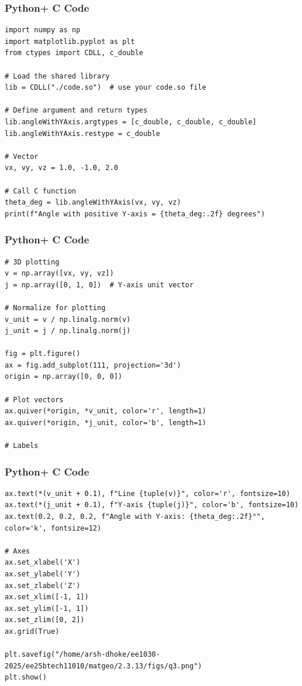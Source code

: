 \documentclass{beamer}
\begin{document}
\begin{frame}[fragile]
    \frametitle{Python+ C Code}
\begin{lstlisting}
import numpy as np
import matplotlib.pyplot as plt
from ctypes import CDLL, c_double

# Load the shared library
lib = CDLL("./code.so")  # use your code.so file

# Define argument and return types
lib.angleWithYAxis.argtypes = [c_double, c_double, c_double]
lib.angleWithYAxis.restype = c_double

# Vector
vx, vy, vz = 1.0, -1.0, 2.0

# Call C function
theta_deg = lib.angleWithYAxis(vx, vy, vz)
print(f"Angle with positive Y-axis = {theta_deg:.2f} degrees")

\end{lstlisting}
\end{frame}

\begin{frame}[fragile]
    \frametitle{Python+ C Code}
\begin{lstlisting}
# 3D plotting
v = np.array([vx, vy, vz])
j = np.array([0, 1, 0])  # Y-axis unit vector

# Normalize for plotting
v_unit = v / np.linalg.norm(v)
j_unit = j / np.linalg.norm(j)

fig = plt.figure()
ax = fig.add_subplot(111, projection='3d')
origin = np.array([0, 0, 0])

# Plot vectors
ax.quiver(*origin, *v_unit, color='r', length=1)
ax.quiver(*origin, *j_unit, color='b', length=1)

# Labels
\end{lstlisting}
\end{frame}

\begin{frame}[fragile]
    \frametitle{Python+ C Code}
\begin{lstlisting}
ax.text(*(v_unit + 0.1), f"Line {tuple(v)}", color='r', fontsize=10)
ax.text(*(j_unit + 0.1), f"Y-axis {tuple(j)}", color='b', fontsize=10)
ax.text(0.2, 0.2, 0.2, f"Angle with Y-axis: {theta_deg:.2f}°", color='k', fontsize=12)

# Axes
ax.set_xlabel('X')
ax.set_ylabel('Y')
ax.set_zlabel('Z')
ax.set_xlim([-1, 1])
ax.set_ylim([-1, 1])
ax.set_zlim([0, 2])
ax.grid(True)

plt.savefig("/home/arsh-dhoke/ee1030-2025/ee25btech11010/matgeo/2.3.13/figs/q3.png")
plt.show()

\end{lstlisting}
\end{frame}
\end{document}
